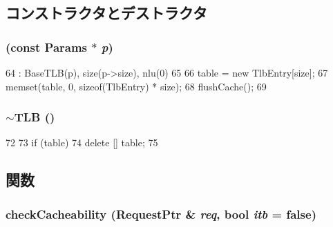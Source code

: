 \subsection{コンストラクタとデストラクタ}
\hypertarget{classAlphaISA_1_1TLB_acb886bd3c59f00c21be9ceaaf25dab97}{
\subsubsection[{TLB}]{ (const {\bf Params} $\ast$ {\em p})}}
\label{classAlphaISA_1_1TLB_acb886bd3c59f00c21be9ceaaf25dab97}



\begin{DoxyCode}
64     : BaseTLB(p), size(p->size), nlu(0)
65 {
66     table = new TlbEntry[size];
67     memset(table, 0, sizeof(TlbEntry) * size);
68     flushCache();
69 }
\end{DoxyCode}
\hypertarget{classAlphaISA_1_1TLB_a18a1722ab7889997b15fd7b9fc33c7ff}{
\subsubsection[{$\sim$TLB}]{\setlength{\rightskip}{0pt plus 5cm}$\sim${\bf TLB} ()}}
\label{classAlphaISA_1_1TLB_a18a1722ab7889997b15fd7b9fc33c7ff}



\begin{DoxyCode}
72 {
73     if (table)
74         delete [] table;
75 }
\end{DoxyCode}


\subsection{関数}
\hypertarget{classAlphaISA_1_1TLB_ae6e8469121a70e90e8213987b19eb83d}{
\subsubsection[{checkCacheability}]{ checkCacheability ({\bf RequestPtr} \& {\em req}, \/  bool {\em itb} = {\ttfamily false})}}
\label{classAlphaISA_1_1TLB_ae6e8469121a70e90e8213987b19eb83d}



